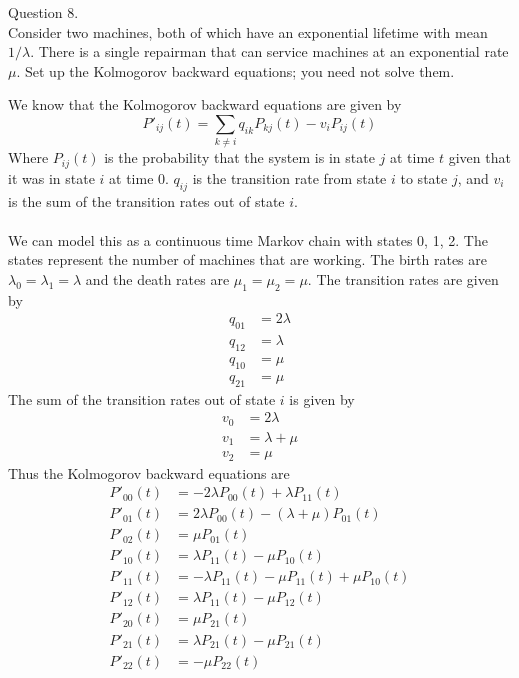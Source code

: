 \documentclass[answers,12pt,addpoints]{exam}
\begin{document}
\begin{questions}
    \question Question 8.\\
    Consider two machines, both of which have an exponential lifetime with mean $1/\lambda$. There is a
    single repairman that can service machines at an exponential rate $\mu$. Set up the Kolmogorov
    backward equations; you need not solve them.
    \begin{solution} 
        We know that the Kolmogorov backward equations are given by
        $$ P'_{ij}(t) = \sum_{k \neq i} q_{ik}P_{kj}(t) - v_i P_{ij}(t)$$
        Where \(P_{ij}(t)\) is the probability that the system is in state \(j\) at time \(t\) given that it was in state \(i\) at time 0. \(q_{ij}\) is the transition rate from state \(i\) to state \(j\), and \(v_i\) is the sum of the transition rates out of state \(i\).\\\\

        We can model this as a continuous time Markov chain with states 0, 1, 2. The states represent the number of machines that are working. The birth rates are \(\lambda_0 = \lambda_1 = \lambda\) and the death rates are \(\mu_1 = \mu_2 = \mu\). 
        The transition rates are given by
        \begin{align*}
            q_{01} &= 2\lambda\\
            q_{12} &= \lambda\\
            q_{10} &= \mu\\
            q_{21} &= \mu
        \end{align*}
        The sum of the transition rates out of state \(i\) is given by
        \begin{align*}
            v_0 &= 2\lambda\\
            v_1 &= \lambda + \mu\\
            v_2 &= \mu
        \end{align*}
        Thus the Kolmogorov backward equations are
        \begin{align*}
            P'_{00}(t) &= -2\lambda P_{00}(t) + \lambda P_{11}(t)\\
            P'_{01}(t) &= 2\lambda P_{00}(t) - (\lambda + \mu)P_{01}(t)\\
            P'_{02}(t) &= \mu P_{01}(t)\\
            P'_{10}(t) &= \lambda P_{11}(t) - \mu P_{10}(t)\\
            P'_{11}(t) &= -\lambda P_{11}(t) - \mu P_{11}(t) + \mu P_{10}(t)\\
            P'_{12}(t) &= \lambda P_{11}(t) - \mu P_{12}(t)\\
            P'_{20}(t) &= \mu P_{21}(t)\\
            P'_{21}(t) &= \lambda P_{21}(t) - \mu P_{21}(t)\\
            P'_{22}(t) &= -\mu P_{22}(t)
        \end{align*}
    \end{solution}



\end{questions}
\end{document}
